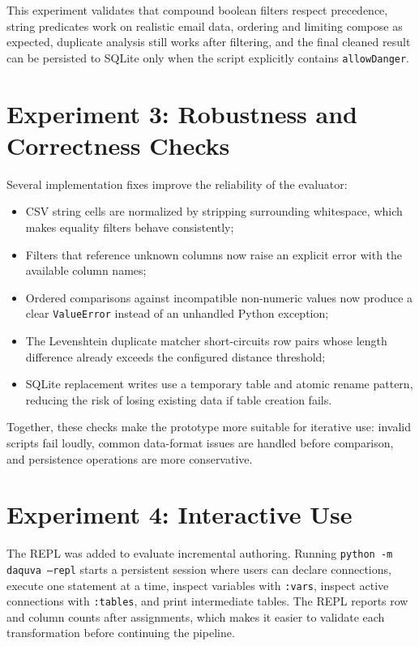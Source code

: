 This experiment validates that compound boolean filters respect precedence,
string predicates work on realistic email data, ordering and limiting compose
as expected, duplicate analysis still works after filtering, and the final
cleaned result can be persisted to SQLite only when the script explicitly
contains \texttt{allowDanger}.

\section{Experiment 3: Robustness and Correctness Checks}

Several implementation fixes improve the reliability of the evaluator:

\begin{itemize}[label=-, noitemsep]
      \item CSV string cells are normalized by stripping surrounding whitespace,
          which makes equality filters behave consistently;
    \item Filters that reference unknown columns now raise an explicit error
          with the available column names;
    \item Ordered comparisons against incompatible non-numeric values now
          produce a clear \texttt{ValueError} instead of an unhandled Python
          exception;
    \item The Levenshtein duplicate matcher short-circuits row pairs whose
          length difference already exceeds the configured distance threshold;
    \item SQLite replacement writes use a temporary table and atomic rename
          pattern, reducing the risk of losing existing data if table creation
          fails.
\end{itemize}

Together, these checks make the prototype more suitable for iterative use:
invalid scripts fail loudly, common data-format issues are handled before
comparison, and persistence operations are more conservative.

\section{Experiment 4: Interactive Use}

The REPL was added to evaluate incremental authoring. Running
\texttt{python -m daquva --repl} starts a persistent session where users can
declare connections, execute one statement at a time, inspect variables with
\texttt{:vars}, inspect active connections with \texttt{:tables}, and print
intermediate tables. The REPL reports row and column counts after assignments,
which makes it easier to validate each transformation before continuing the
pipeline.

